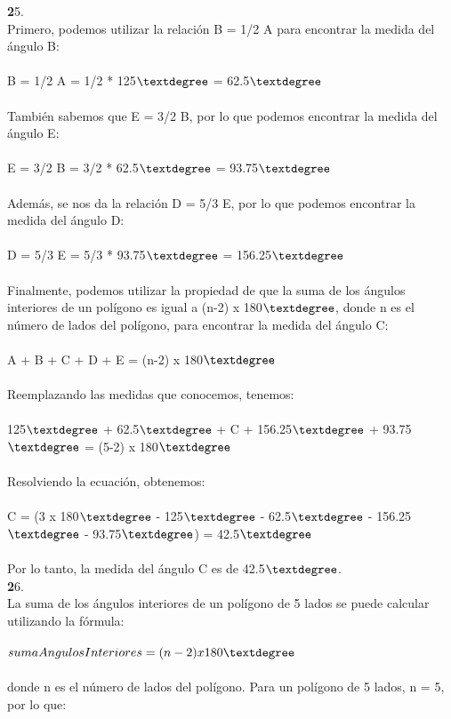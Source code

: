 \documentclass{article}
\begin{document}
{\textbf 25. }\\
Primero, podemos utilizar la relación B = 1/2 A para encontrar la medida del ángulo B:\\
\\
B = 1/2 A = 1/2 * 125$\textdegree$ = 62.5$\textdegree$\\
\\
También sabemos que E = 3/2 B, por lo que podemos encontrar la medida del ángulo E:\\
\\
E = 3/2 B = 3/2 * 62.5$\textdegree$ = 93.75$\textdegree$\\
\\
Además, se nos da la relación D = 5/3 E, por lo que podemos encontrar la medida del ángulo D:\\
\\
D = 5/3 E = 5/3 * 93.75$\textdegree$ = 156.25$\textdegree$\\
\\
Finalmente, podemos utilizar la propiedad de que la suma de los ángulos interiores de un polígono es igual a (n-2) x 180$\textdegree$, donde n es el número de lados del polígono, para encontrar la medida del ángulo C:\\
\\
A + B + C + D + E = (n-2) x 180$\textdegree$\\
\\
Reemplazando las medidas que conocemos, tenemos:\\
\\
125$\textdegree$ + 62.5$\textdegree$ + C + 156.25$\textdegree$ + 93.75$\textdegree$ = (5-2) x 180$\textdegree$\\
\\
Resolviendo la ecuación, obtenemos:\\
\\
C = (3 x 180$\textdegree$ - 125$\textdegree$ - 62.5$\textdegree$ - 156.25$\textdegree$ - 93.75$\textdegree$) = 42.5$\textdegree$\\
\\
Por lo tanto, la medida del ángulo C es de 42.5$\textdegree$.\\
{\textbf 26. }\\
La suma de los ángulos interiores de un polígono de 5 lados se puede calcular utilizando la fórmula:\\
\\
$sumaAngulosInteriores = (n-2) x 180\textdegree$\\
\\
donde n es el número de lados del polígono. Para un polígono de 5 lados, n = 5, por lo que:\\
\end{document}
